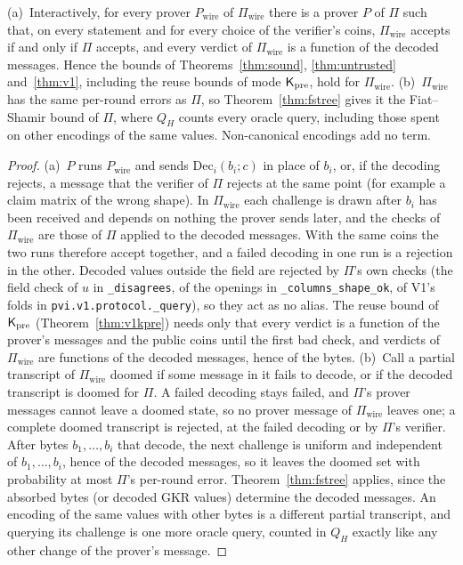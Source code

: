 \begin{theorem}
\label{thm:codec}
(a)~Interactively, for every prover $P_{\mathrm{wire}}$ of $\Pi_{\mathrm{wire}}$ there is a prover $P$
of $\Pi$ such that, on every statement and for every choice of the verifier's coins,
$\Pi_{\mathrm{wire}}$ accepts if and only if $\Pi$ accepts, and every verdict of
$\Pi_{\mathrm{wire}}$ is a function of the decoded messages. Hence the bounds of Theorems~\ref{thm:sound},
\ref{thm:untrusted} and~\ref{thm:v1}, including the reuse bounds of mode $\mathsf{K}_{\mathrm{pre}}$, hold for
$\Pi_{\mathrm{wire}}$.
(b)~$\Pi_{\mathrm{wire}}$ has the same per-round errors as $\Pi$, so Theorem~\ref{thm:fstree} gives
it the Fiat--Shamir bound of $\Pi$, where $Q_H$ counts every oracle query, including those spent on
other encodings of the same values. Non-canonical encodings add no term.
\end{theorem}

\begin{proof}
(a)~$P$ runs $P_{\mathrm{wire}}$ and sends $\mathrm{Dec}_i(b_i;c)$ in place of $b_i$, or, if the
decoding rejects, a message that the verifier of $\Pi$ rejects at the same point (for example a
claim matrix of the wrong shape). In $\Pi_{\mathrm{wire}}$ each challenge is drawn after $b_i$ has
been received and depends on nothing the prover sends later, and the checks of
$\Pi_{\mathrm{wire}}$ are those of $\Pi$ applied to the decoded messages. With the same coins the two
runs therefore accept together, and a failed decoding in one run is a rejection in the other.
Decoded values outside the field are rejected by
$\Pi$'s own checks (the field check of $u$ in \texttt{\_disagrees}, of the openings in
\texttt{\_columns\_shape\_ok}, of V1's folds in \texttt{pvi.v1.protocol.\_query}), so they act as no
alias. The reuse bound of $\mathsf{K}_{\mathrm{pre}}$ (Theorem~\ref{thm:v1kpre}) needs only that every verdict is a
function of the prover's messages and the public coins until the first bad check, and verdicts of
$\Pi_{\mathrm{wire}}$ are functions of the decoded messages, hence of the bytes.
(b)~Call a partial transcript of $\Pi_{\mathrm{wire}}$ doomed if some message in it fails to decode,
or if the decoded transcript is doomed for $\Pi$. A failed decoding stays failed, and $\Pi$'s prover
messages cannot leave a doomed state, so no prover message of $\Pi_{\mathrm{wire}}$ leaves one; a
complete doomed transcript is rejected, at the failed decoding or by $\Pi$'s verifier. After bytes
$b_1,\dots,b_i$ that decode, the next challenge is uniform and independent of $b_1,\dots,b_i$, hence
of the decoded messages, so it leaves the doomed set with probability at most $\Pi$'s per-round
error. Theorem~\ref{thm:fstree} applies, since the absorbed bytes (or decoded GKR values) determine
the decoded messages. An encoding of the same values with other bytes is a different partial
transcript, and querying its challenge is one more oracle query, counted in $Q_H$ exactly like any
other change of the prover's message.
\end{proof}

